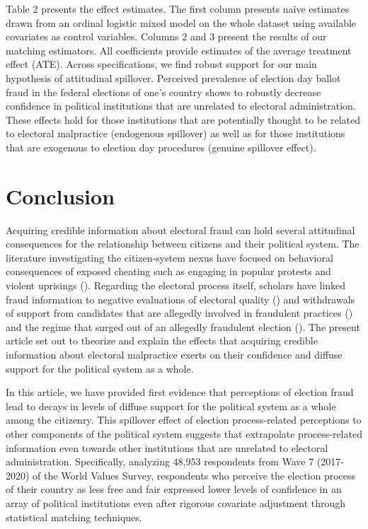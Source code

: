 \documentclass[11pt, ngerman,english,a4]{article}
\begin{document}
Table 2 presents the effect estimates. The first column presents na{\"i}ve estimates drawn from an ordinal logistic mixed model on the whole dataset using available covariates as control variables. Columns 2 and 3 present the results of our matching estimators. All coefficients provide estimates of the average treatment effect (ATE). Across specifications, we find robust support for our main hypothesis of attitudinal spillover. Perceived prevalence of election day ballot fraud in the federal elections of one's country shows to robustly decrease confidence in political institutions that are unrelated to electoral administration. These effects hold for those institutions that are potentially thought to be related to electoral malpractice (endogenous spillover) as well as for those institutions that are exogenous to election day procedures (genuine spillover effect). 

\section*{Conclusion}

Acquiring credible information about electoral fraud can hold several attitudinal consequences for the relationship between citizens and their political system. The literature investigating the citizen-system nexus have focused on behavioral consequences of exposed cheating such as engaging in popular protests and violent uprisings (\citealt{Daxecker2012}). Regarding the electoral process itself, scholars have linked fraud information to negative evaluations of electoral quality (\citealt{Robertson2017}) and withdrawals of support from candidates that are allegedly involved in fraudulent practices (\citealt{Reuter2019}) and the regime that surged out of an allegedly fraudulent election (\citealt{Williamson2021}). The present article set out to theorize and explain the effects that acquiring credible information about electoral malpractice exerts on their confidence and diffuse support for the political system as a whole. 

In this article, we have provided first evidence that perceptions of election fraud lead to decays in levels of diffuse support for the political system as a whole among the citizenry. This spillover effect of election process-related perceptions to other components of the political system suggests that extrapolate process-related information even towards other institutions that are unrelated to electoral administration. Specifically, analyzing 48,953 respondents from Wave 7 (2017-2020) of the World Values Survey, respondents who perceive the election process of their country as less free and fair expressed lower levels of confidence in an array of political institutions even after rigorous covariate adjustment through statistical matching techniques. 
\end{document}
